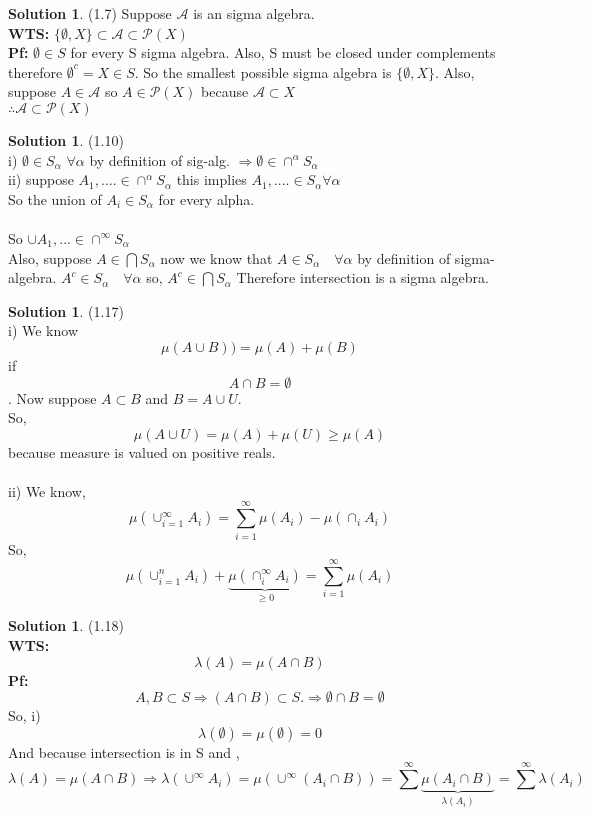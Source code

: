 \documentclass[letterpaper,12pt]{article}
\theoremstyle{definition}
\newtheorem{solution}[theorem]{Solution}
\begin{document}
\begin{solution} (1.7)
Suppose $\mathcal{A}$ is an sigma algebra. \\
\textbf{WTS:} $\{\emptyset,X\} \subset \mathcal{A} \subset \mathcal{P}(X)$ \\
\textbf{Pf:} $\emptyset \in S$ for every S sigma algebra. Also, S must be closed under complements
therefore $\emptyset^c = X \in S$. So the smallest possible sigma algebra is $\{\emptyset,X\}$. Also, suppose $A \in \mathcal{A}$ so $A \in \mathcal{P}(X)$ because $\mathcal{A} \subset X$ \\$ \therefore \mathcal{A} \subset \mathcal{P}(X)$

\end{solution}

\begin{solution} (1.10) \\
i) $\emptyset \in S_\alpha$  \quad $ \forall \alpha$ by definition of sig-alg. $\Rightarrow \emptyset \in \cap^\alpha S_\alpha$ \\
ii) suppose $A_1,.... \in \cap^\alpha S_\alpha$ this implies $A_1,.... \in S_\alpha \forall \alpha$ \\
So the union of $A_i \in S_\alpha$ for every alpha. \\~\\
So $\cup A_1,... \in \cap^\infty S_\alpha$ \\
Also, suppose $A \in \bigcap S_\alpha$ now we know that $A \in S_\alpha \quad \forall \alpha$ by definition of sigma-algebra. $A^c \in S_\alpha \quad \forall \alpha$ so, $A^c \in \bigcap S_\alpha$
Therefore intersection is a sigma algebra.

\end{solution}

\begin{solution} (1.17) \\
i) We know \[ \mu(A\cup B)) = \mu(A) + \mu(B)\] if \[A\cap B = \emptyset\].
Now suppose $A \subset B$ and
$B = A \cup U$. \\
So, \[\mu(A \cup U) = \mu(A) + \mu(U) \ge \mu(A)\] because measure is valued on positive reals.
\\~\\

ii) We know, \[
\mu (\cup_{i=1}^\infty A_i) = \sum_{i=1}^\infty \mu(A_i) - \mu(\cap_i A_i)
\]
So, \[
\mu(\cup_{i=1}^n A_i) + \underbrace{\mu(\cap_i^\infty A_i)}_{\ge 0} = \sum_{i=1}^\infty \mu(A_i)
\]
\end{solution}

\begin{solution} (1.18) \\
\textbf{WTS:}\[
\lambda(A) = \mu(A\cap B)
\]
\textbf{Pf:}\[ A,B \subset S \Rightarrow (A \cap B) \subset S. \Rightarrow \emptyset \cap B
= \emptyset
\]
So, i) \[ \lambda(\emptyset) = \mu(\emptyset) = 0
\]
And because intersection is in S and , \[\lambda(A) = \mu(A\cap B) \Rightarrow
\lambda(\cup^\infty A_i) = \mu(\cup^\infty (A_i \cap B)) = \sum^\infty \underbrace{\mu(A_i \cap B)}_{\lambda(A_i)}
= \sum^\infty \lambda(A_i)
\]
\end{solution}
\end{document}
